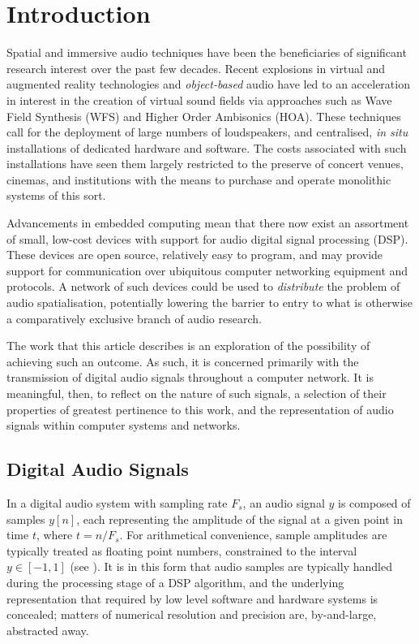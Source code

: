 \section{Introduction}\label{sec:intro}

Spatial and immersive audio techniques have been the beneficiaries of
significant research interest over the past few decades.
Recent explosions in virtual and augmented reality technologies and
\textit{object-based} audio have led to an acceleration in interest in the
creation of virtual sound fields via approaches such as Wave Field Synthesis
(WFS) and Higher Order Ambisonics (HOA)\cite{}.
These techniques call for the deployment of large numbers of loudspeakers, and
centralised, \textit{in situ} installations of dedicated hardware and software.
The costs associated with such installations have seen them largely restricted
to the preserve of concert venues, cinemas, and institutions with the means to
purchase and operate monolithic systems of this sort.

Advancements in embedded computing mean that there now exist an assortment of
small, low-cost devices with support for audio digital signal processing (DSP).
These devices are open source, relatively easy to program, and may provide
support for communication over ubiquitous computer networking equipment and
protocols.
A network of such devices could be used to \textit{distribute} the problem of
audio spatialisation, potentially lowering the barrier to entry to what is
otherwise a comparatively exclusive branch of audio research.

The work that this article describes is an exploration of the possibility of
achieving such an outcome.
As such, it is concerned primarily with the transmission of digital audio
signals throughout a computer network.
It is meaningful, then, to reflect on the nature of such signals, a selection
of their properties of greatest pertinence to this work, and the representation
of audio signals within computer systems and networks.

\subsection{Digital Audio Signals}
\label{subsec:digital-audio-signals}

In a digital audio system with sampling rate $F_s$, an audio signal $y$ is
composed of samples $y[n]$, each representing the amplitude of the signal at a
given point in time $t$, where $t = n/F_s$.
For arithmetical convenience, sample amplitudes are typically treated as
floating point numbers, constrained to the interval $y \in [-1, 1]$ (see
).
It is in this form that audio samples are typically handled during the
processing stage of a DSP algorithm, and the underlying representation
\textemdash{} that required by low level software and hardware systems
\textemdash{} is concealed; matters of numerical resolution and precision are,
by-and-large, abstracted away.


